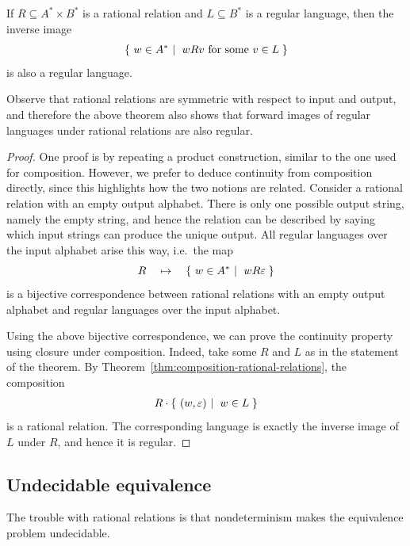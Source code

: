 \begin{theorem}\label{thm:continuity-rational-relations}
    If $R \subseteq A^* \times B^*$ is a rational relation and $L \subseteq B^*$ is a regular language, then the inverse image 
    \begin{align*}
    \setbuild{ w \in A^*}{$w R v$ for some $v \in L$}
    \end{align*}
    is also a regular language. 
\end{theorem}
Observe that rational relations are symmetric with respect to input and output, and therefore the above theorem also shows that forward images of regular languages under rational relations are also regular.
\begin{proof}
    One proof is by repeating a product construction, similar to the one used for composition. However, we prefer to deduce continuity from composition directly, since this highlights how the two notions are related. Consider a rational relation
    with an empty output alphabet. There is only one possible output string, namely the empty string, and hence the relation can be described by saying which input strings can produce the unique output. All regular languages over the input alphabet arise this way, i.e.~the map
    \begin{align*}
    R \quad \mapsto \quad \setbuild{ w \in A^*}{$w R \varepsilon$}
    \end{align*}
    is a bijective correspondence between rational relations with an empty output alphabet and regular languages over the input alphabet.

    Using the above  bijective correspondence, we can prove the continuity property using closure under composition. Indeed, take some $R$ and $L$ as in the statement of the theorem. By Theorem~\ref{thm:composition-rational-relations}, the composition 
    \begin{align*}
    R \cdot \setbuild{(w,\varepsilon)}{$w \in L$}
    \end{align*}
    is a rational relation. The corresponding language is exactly the inverse image of $L$ under $R$, and hence it is regular.
\end{proof}



\subsection{Undecidable equivalence} The trouble with rational relations is that  nondeterminism makes the equivalence problem undecidable.



